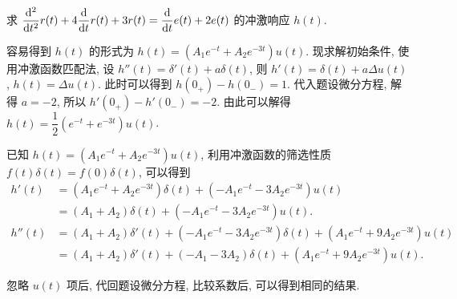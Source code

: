 \begin{exampleprob}
    求 $\ddd{2}{t}r(t)+4\ddd{1}{t}r(t)+3r(t)=\ddd{1}{t}e(t)+2e(t)$ 的冲激响应 $h(t)$.

    \begin{solution}[1]
        容易得到 $h(t)$ 的形式为 $h(t)=(A_1e^{-t}+A_2e^{-3t})u(t)$. 现求解初始条件, 使用冲激函数匹配法, 设 $h''(t)=\delta'(t)+a\delta(t)$, 则 $h'(t)=\delta(t)+a\Delta u(t)$, $h(t)=\Delta u(t)$. 此时可以得到 $h(0_+)-h(0_-)=1$. 代入题设微分方程, 解得 $a=-2$, 所以 $h'(0_+)-h'(0_-)=-2$. 由此可以解得 $h(t)=\dfrac{1}{2}(e^{-t}+e^{-3t})u(t)$.
    \end{solution}

    \begin{solution}[2]
        已知 $h(t)=(A_1e^{-t}+A_2e^{-3t})u(t)$, 利用冲激函数的筛选性质 $f(t)\delta(t)=f(0)\delta(t)$, 可以得到
        \begin{align*}
            h'(t)  & =(A_1e^{-t}+A_2e^{-3t})\delta(t)+(-A_1e^{-t}-3A_2e^{-3t})u(t)                       \\
                   & =(A_1+A_2)\delta(t)+(-A_1e^{-t}-3A_2e^{-3t})u(t).                                   \\
            h''(t) & = (A_1+A_2)\delta'(t)+(-A_1e^{-t}-3A_2e^{-3t})\delta(t)+(A_1e^{-t}+9A_2e^{-3t})u(t) \\
                   & =(A_1+A_2)\delta'(t)+(-A_1-3A_2)\delta(t)+(A_1e^{-t}+9A_2e^{-3t})u(t).
        \end{align*}

        忽略 $u(t)$ 项后, 代回题设微分方程, 比较系数后, 可以得到相同的结果.
    \end{solution}
\end{exampleprob}

